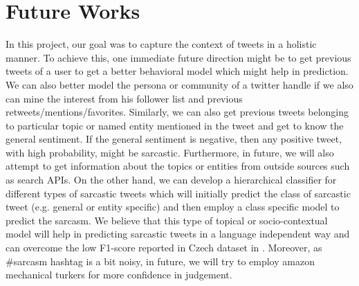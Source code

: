 \section{Future Works}
\label{sec:future}
In this project, our goal was to capture the context of tweets in a holistic manner. To achieve this, one immediate future direction might be to get previous tweets of a user to get a better behavioral model which might help in prediction. We can also better model the persona or community of a twitter handle if we also can mine the interest from his follower list and previous retweets/mentions/favorites. Similarly, we can also get previous tweets belonging to particular topic or named entity mentioned in the tweet and get to know the general sentiment. If the general sentiment is negative, then any positive tweet, with high probability, might be sarcastic. Furthermore, in future, we will also attempt to get information about the topics or entities from outside sources such as search APIs. On the other hand, we can develop a hierarchical classifier for different types of sarcastic tweets which will initially predict the class of sarcastic tweet (e.g. general or entity specific) and then employ a class specific model to predict the sarcasm. We believe that this type of topical or socio-contextual model will help in predicting sarcastic tweets in a language independent way and can overcome the low F1-score reported in Czech dataset in \cite{tomas14}. Moreover, as \#sarcasm hashtag is a bit noisy, in future, we will try to employ amazon mechanical turkers for more confidence in judgement.